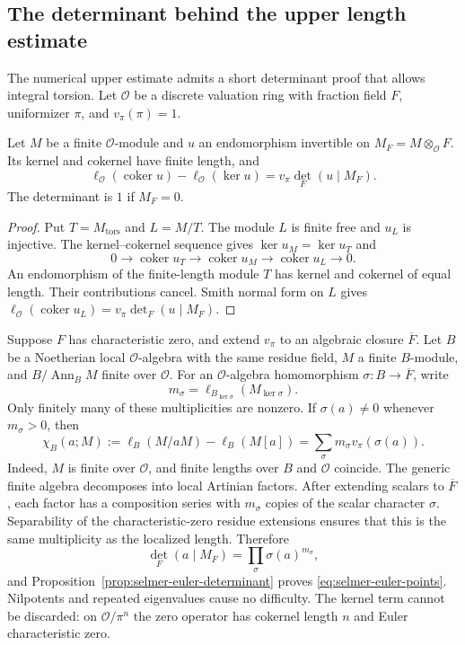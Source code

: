 \subsection{The determinant behind the upper length estimate}
\label{subsec:selmer-euler-determinant}

The numerical upper estimate admits a short determinant proof that allows
integral torsion. Let $\mathcal O$ be a discrete valuation ring with fraction
field $F$, uniformizer $\pi$, and $v_\pi(\pi)=1$.

\begin{proposition}
\label{prop:selmer-euler-determinant}
Let $M$ be a finite $\mathcal O$-module and $u$ an endomorphism invertible on
$M_F=M\otimes_{\mathcal O}F$. Its kernel and cokernel have finite length, and
\[
 \ell_{\mathcal O}(\operatorname{coker}u)
 -\ell_{\mathcal O}(\ker u)
 =v_\pi\det_F(u\mid M_F).
\]
The determinant is $1$ if $M_F=0$.
\end{proposition}

\begin{proof}
Put $T=M_{\mathrm{tors}}$ and $L=M/T$. The module $L$ is finite free and
$u_L$ is injective. The kernel--cokernel sequence gives
$\ker u_M=\ker u_T$ and
\[
 0\longrightarrow\operatorname{coker}u_T
 \longrightarrow\operatorname{coker}u_M
 \longrightarrow\operatorname{coker}u_L\longrightarrow0.
\]
An endomorphism of the finite-length module $T$ has kernel and cokernel of
equal length. Their contributions cancel. Smith normal form on $L$ gives
$\ell_{\mathcal O}(\operatorname{coker}u_L)=v_\pi\det_F(u\mid M_F)$.
\end{proof}

Suppose $F$ has characteristic zero, and extend $v_\pi$ to an algebraic
closure $\overline F$. Let $B$ be a Noetherian local $\mathcal O$-algebra
with the same residue field, $M$ a finite $B$-module, and
$B/\operatorname{Ann}_B M$ finite over $\mathcal O$. For an
$\mathcal O$-algebra homomorphism $\sigma:B\to\overline F$, write
\[
 m_\sigma=\ell_{B_{\ker\sigma}}(M_{\ker\sigma}).
\]
Only finitely many of these multiplicities are nonzero. If
$\sigma(a)\ne0$ whenever $m_\sigma>0$, then
\begin{equation}
 \chi_B(a;M):=\ell_B(M/aM)-\ell_B(M[a])
 =\sum_\sigma m_\sigma v_\pi(\sigma(a)).
 \label{eq:selmer-euler-points}
\end{equation}
Indeed, $M$ is finite over $\mathcal O$, and finite lengths over $B$ and
$\mathcal O$ coincide. The generic finite algebra decomposes into local
Artinian factors. After extending scalars to $\overline F$, each factor
has a composition series with $m_\sigma$ copies of the scalar character
$\sigma$. Separability of the characteristic-zero residue extensions
ensures that this is the same multiplicity as the localized length.
Therefore
\[
 \det_F(a\mid M_F)=\prod_\sigma\sigma(a)^{m_\sigma},
\]
and Proposition~\ref{prop:selmer-euler-determinant} proves
\eqref{eq:selmer-euler-points}. Nilpotents and repeated eigenvalues cause
no difficulty. The kernel term cannot be discarded: on
$\mathcal O/\pi^n$ the zero operator has cokernel length $n$ and Euler
characteristic zero.

